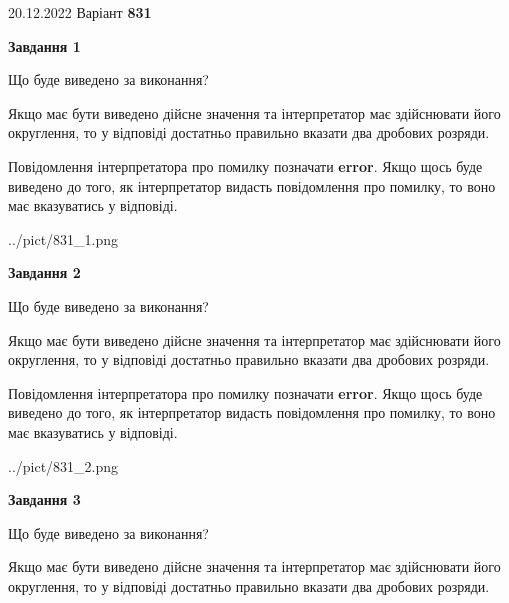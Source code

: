 \documentclass[12pt, ukrainian]{article}
\begin{document}
{20.12.2022 Варіант \No \textbf { 831 }\par}
{
\begin {Large}

{\begin {center}\textbf{Завдання 1}\end {center}}\par
Що буде виведено за виконання? \par

Якщо має бути виведено дійсне значення та інтерпретатор має здійснювати його округлення, 
то у відповіді достатньо правильно вказати два дробових розряди.

Повідомлення інтерпретатора про помилку позначати \textbf{error}.
Якщо щось буде виведено до того, як інтерпретатор видасть повідомлення про помилку, 
то воно має вказуватись у відповіді. \par

\begin{center}
	{../pict/831_1.png}
\end{center}
\newpage

{\begin {center}\textbf{Завдання 2}\end {center}}\par
Що буде виведено за виконання? \par

Якщо має бути виведено дійсне значення та інтерпретатор має здійснювати його округлення, 
то у відповіді достатньо правильно вказати два дробових розряди.

Повідомлення інтерпретатора про помилку позначати \textbf{error}.
Якщо щось буде виведено до того, як інтерпретатор видасть повідомлення про помилку, 
то воно має вказуватись у відповіді. \par

\begin{center}
	{../pict/831_2.png}
\end{center}
\newpage

{\begin {center}\textbf{Завдання 3}\end {center}}\par
Що буде виведено за виконання? \par

Якщо має бути виведено дійсне значення та інтерпретатор має здійснювати його округлення, 
то у відповіді достатньо правильно вказати два дробових розряди.


\end{Large}}
\end{document}
